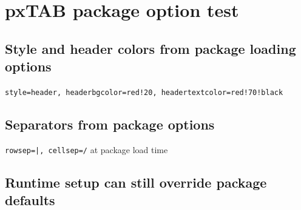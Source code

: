 \documentclass{article}
\begin{document}
\section*{pxTAB package option test}

\subsection*{Style and header colors from package loading options}
\texttt{style=header, headerbgcolor=red!20, headertextcolor=red!70!black}\par
{}

\subsection*{Separators from package options}
\texttt{rowsep=|, cellsep=/} at package load time\par
{}

\subsection*{Runtime setup can still override package defaults}
\end{document}
